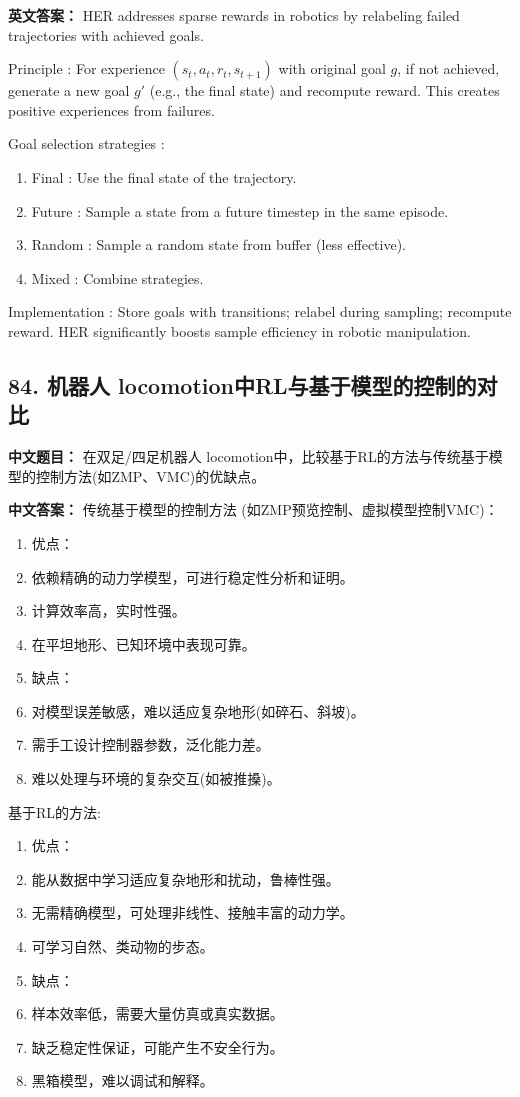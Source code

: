 \documentclass[10pt,a4paper]{ctexart}
\begin{document}
\textbf{英文答案：}  
HER addresses sparse rewards in robotics by relabeling failed trajectories with achieved goals.

 Principle : For experience \((s_t, a_t, r_t, s_{t+1})\) with original goal \(g\), if not achieved, generate a new goal \(g'\) (e.g., the final state) and recompute reward. This creates positive experiences from failures.

 Goal selection strategies :
\begin{enumerate}
    \item Final : Use the final state of the trajectory.
    \item Future : Sample a state from a future timestep in the same episode.
    \item Random : Sample a random state from buffer (less effective).
    \item Mixed : Combine strategies.
\end{enumerate}

 Implementation : Store goals with transitions; relabel during sampling; recompute reward. HER significantly boosts sample efficiency in robotic manipulation.

\subsection*{84. 机器人 locomotion中RL与基于模型的控制的对比}
\textbf{中文题目：} 在双足/四足机器人 locomotion中，比较基于RL的方法与传统基于模型的控制方法(如ZMP、VMC)的优缺点。

\textbf{中文答案：}  
 传统基于模型的控制方法 (如ZMP预览控制、虚拟模型控制VMC)：
\begin{enumerate}
    \item 优点：
      \item 依赖精确的动力学模型，可进行稳定性分析和证明。
      \item 计算效率高，实时性强。
      \item 在平坦地形、已知环境中表现可靠。
    \item 缺点：
      \item 对模型误差敏感，难以适应复杂地形(如碎石、斜坡)。
      \item 需手工设计控制器参数，泛化能力差。
      \item 难以处理与环境的复杂交互(如被推搡)。
\end{enumerate}

 基于RL的方法:
\begin{enumerate}
    \item 优点：
      \item 能从数据中学习适应复杂地形和扰动，鲁棒性强。
      \item 无需精确模型，可处理非线性、接触丰富的动力学。
      \item 可学习自然、类动物的步态。
    \item 缺点：
      \item 样本效率低，需要大量仿真或真实数据。
      \item 缺乏稳定性保证，可能产生不安全行为。
      \item 黑箱模型，难以调试和解释。
\end{enumerate}
\end{document}
